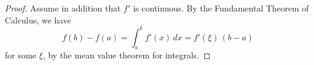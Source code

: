 

\begin{proof} Assume in addition that $f'$ is continuous.
By the Fundamental Theorem of Calculus, we have 
$$
f(b)-f(a) = \int_a^b f'(x)\,dx = f'(\xi)\,(b-a)
$$
for some $\xi$, by the mean value theorem for integrals.

\end{proof}


